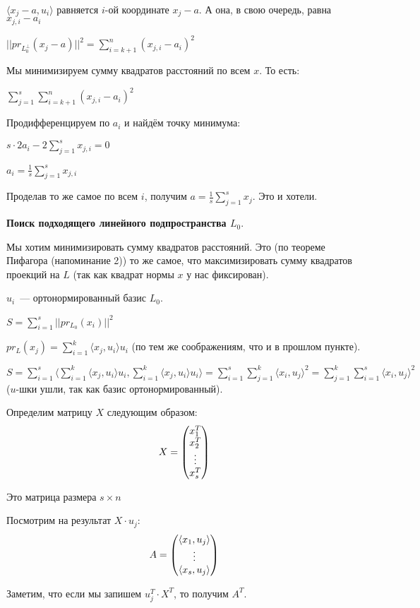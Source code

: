 $\langle x_j - a, u_i\rangle$ равняется $i$-ой координате $x_j - a$. А она, в свою очередь, равна $x_{j, i} - a_i$

$||pr_{L_0^{\perp}}(x_j-a)||^2 = \sum\limits_{i = k + 1}^n (x_{j, i} - a_i)^2$

Мы минимизируем сумму квадратов расстояний по всем $x$. То есть:

$\sum\limits_{j = 1}^s \sum\limits_{i = k + 1}^n (x_{j, i} - a_i)^2$

Продифференцируем по $a_i$ и найдём точку минимума:

$s\cdot 2a_i -2\sum\limits_{j=1}^s x_{j, i} = 0$

$a_i = \frac{1}{s} \sum\limits_{j=1}^s x_{j, i}$

Проделав то же самое по всем $i$, получим $a = \frac{1}{s} \sum\limits_{j=1}^s x_j$. Это и хотели.

{\bf Поиск подходящего линейного подпространства $L_0$}.

Мы хотим минимизировать сумму квадратов расстояний. Это (по теореме Пифагора (напоминание 2)) то же самое, что максимизировать сумму квадратов проекций на $L$ (так как квадрат нормы $x$ у нас фиксирован).

$u_i$~--- ортонормированный базис $L_0$.

$S = \sum\limits_{i = 1}^s ||pr_{L_0}(x_i)||^2$

$pr_L(x_j) = \sum\limits_{i = 1}^k \langle x_j, u_i\rangle u_i$ (по тем же соображениям, что и в прошлом пункте).

$S = \sum\limits_{i = 1}^s\langle\sum\limits_{i = 1}^k \langle x_j, u_i\rangle u_i, \sum\limits_{i = 1}^k \langle x_j, u_i\rangle u_i\rangle = \sum\limits_{i = 1}^s\sum\limits_{j = 1}^k \langle x_i, u_j\rangle^2 = \sum\limits_{j = 1}^k\sum\limits_{i = 1}^s \langle x_i, u_j\rangle^2$ ($u$-шки ушли, так как базис ортонормированный).

Определим матрицу $X$ следующим образом:
$$
X = \begin{pmatrix}
x_1^T\\
x_2^T\\
\vdots\\
x_s^T
\end{pmatrix}
$$

Это матрица размера $s\times n$

Посмотрим на результат $X\cdot u_j$:
$$
A=\begin{pmatrix}
\langle x_1, u_j\rangle\\
\vdots\\
\langle x_s, u_j\rangle
\end{pmatrix} 
$$

Заметим, что если мы запишем $u_j^T\cdot X^T$, то получим $A^T$.

